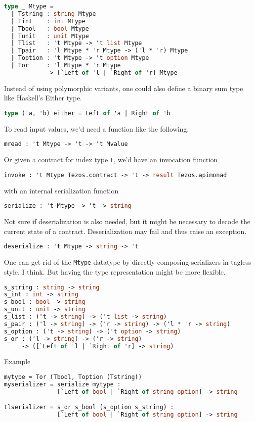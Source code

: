 \documentclass{article}
\begin{document}
\begin{lstlisting}[language=Caml]
type _ Mtype = 
  | Tstring : string Mtype
  | Tint    : int Mtype
  | Tbool   : bool Mtype
  | Tunit   : unit Mtype
  | Tlist   : 't Mtype -> 't list Mtype
  | Tpair   : 'l Mtype * 'r Mtype -> ('l * 'r) Mtype
  | Toption : 't Mtype -> 't option Mtype
  | Tor     : 'l Mtype * 'r Mtype 
            -> [`Left of 'l | `Right of 'r] Mtype
\end{lstlisting}
Instead of using polymorphic variants, one could also define a binary
sum type like Haskell's Either type.
\begin{lstlisting}[language=Caml]
type ('a, 'b) either = Left of 'a | Right of 'b
\end{lstlisting}

To read input values, we'd need a function like the following.
\begin{lstlisting}[language=Caml]
mread : 't Mtype -> 't -> 't Mvalue
\end{lstlisting}

Or given a contract for index type \lstinline/t/, we'd have an
invocation function
\begin{lstlisting}[language=Caml]
invoke : 't Mtype Tezos.contract -> 't -> result Tezos.apimonad
\end{lstlisting}
with an internal serialization function
\begin{lstlisting}[language=Caml]
serialize : 't Mtype -> 't -> string
\end{lstlisting}
Not sure if deserialization is also needed, but it might be necessary
to decode the current state of a contract. Deserialization may fail
and thus raise an exception.
\begin{lstlisting}[language=Caml]
deserialize : 't Mtype -> string -> 't
\end{lstlisting}

One can get rid of the \lstinline/Mtype/ datatype by directly
composing serializers in tagless style. I think. But having the type
representation might be more flexible.
\begin{lstlisting}[language=Caml]
s_string : string -> string
s_int : int -> string
s_bool : bool -> string
s_unit : unit -> string
s_list : ('t -> string) -> ('t list -> string)
s_pair : ('l -> string) -> ('r -> string) -> ('l * 'r -> string)
s_option : ('t -> string) -> ('t option -> string)
s_or : ('l -> string) -> ('r -> string) 
     -> ([`Left of 'l | `Right of 'r] -> string)
\end{lstlisting}

Example
\begin{lstlisting}[language=Caml]
mytype = Tor (Tbool, Toption (Tstring))
myserializer = serialize mytype : 
               [`Left of bool | `Right of string option] -> string

tlserializer = s_or s_bool (s_option s_string) :
               [`Left of bool | `Right of string option] -> string
\end{lstlisting}
\end{document}

